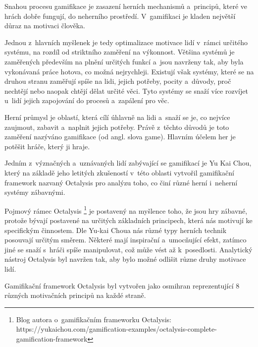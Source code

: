 \documentclass[12pt]{article}
\begin{document}

Snahou procesu gamifikace je zasazení herních mechanismů a~principů,
které ve hrách dobře fungují, do neherního prostředí.
V~gamifikaci je kladen největší důraz na motivaci člověka.

Jednou z~hlavních myšlenek je tedy optimalizace motivace lidí
v~rámci určitého systému, na rozdíl od striktního zaměření na výkonnost.
Většina systémů je zaměřených především na plnění určitých funkcí 
a~jsou navrženy tak, aby byla vykonávaná práce hotova, co možná nejrychleji.
Existují však systémy, které se na druhou stranu zaměřují spíše na lidi,
jejich potřeby, pocity a~důvody, proč nechtějí nebo naopak chtějí dělat určité věci.
Tyto systémy se snaží více rozvíjet u~lidí jejich zapojování do procesů 
a~zapálení pro věc.

Herní průmysl je oblastí, která cílí úhlavně na lidi a~snaží se je,
co nejvíce zaujmout, zabavit a~naplnit jejich potřeby.
Právě z~těchto důvodů je toto zaměření nazýváno gamifikace (od angl. slova game). 
Hlavním účelem her je potěšit hráče, který ji hraje. \cite{octalysis}


Jedním z~význačných a~uznávaných lidí zabývající se gamifikací je Yu Kai Chou,
který na základě jeho letitých zkušeností v~této oblasti vytvořil gamifikační
framework nazvaný Octalysis pro analýzu toho, co činí různé herní i~neherní systémy
zábavnými.

Pojmový rámec Octalysis
\footnote{Blog autora o~gamifikačním frameworku Octalysis:
https://yukaichou.com/gamification-examples/octalysis-complete-gamification-framework}
je postavený na myšlence toho,
že jsou hry zábavné, protože bývají postavené na určitých základních principech,
která nás motivují ke specifickým činnostem.
Dle Yu-kai Choua nás různé typy herních technik posouvají určitým směrem.
Některé mají inspirační a~umocňující efekt,
zatímco jiné se snaží s~hráči spíše manipulovat,
což může vést až k~posedlosti.
Analytický nástroj Octalysis byl navržen tak,
aby bylo možné odlišit různe druhy motivace lidí.

\clearpage

Gamifikační framework Octalysis byl vytvořen jako osmihran reprezentující
8 různých motivačních principů na každé straně.

\obrazek
{}
\end{document}
